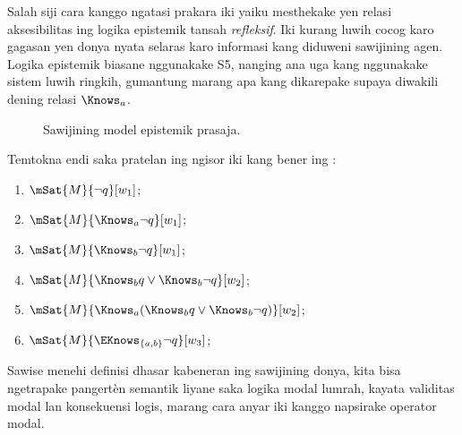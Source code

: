 \documentclass[../../../include/open-logic-section]{subfiles}
\begin{document}
Salah siji cara kanggo ngatasi prakara iki yaiku mesthekake yen
relasi aksesibilitas ing logika epistemik tansah \emph{refleksif}.
Iki kurang luwih cocog karo gagasan yen donya nyata selaras karo
informasi kang diduweni sawijining agen. Logika epistemik biasane
nggunakake S5, nanging ana uga kang nggunakake sistem luwih ringkih,
gumantung marang apa kang dikarepake supaya diwakili dening relasi
$\Knows_a$.

\begin{figure}
  \begin{center}
  \end{center}
  \caption{Sawijining model epistemik prasaja.}
\end{figure}

\begin{prob}
  Temtokna endi saka pratelan ing ngisor iki kang bener ing
  :
  \begin{enumerate}
    \item $\mSat{M}{\lnot q}[w_1]$;
    \item $\mSat{M}{\Knows_a \lnot q}[w_1]$;
    \item $\mSat{M}{\Knows_b \lnot q}[w_1]$;
    \item $\mSat{M}{\Knows_b q \lor \Knows_b \lnot q}[w_2]$;
    \item $\mSat{M}{\Knows_a( \Knows_b q \lor \Knows_b \lnot q)}[w_2]$;
    \item $\mSat{M}{\EKnows_{\{a,b\}} \lnot q}[w_3]$;
    \end{enumerate}
\end{prob}

Sawise menehi definisi dhasar kabeneran ing sawijining donya, kita
bisa ngetrapake pangertèn semantik liyane saka logika modal lumrah,
kayata validitas modal lan konsekuensi logis, marang cara anyar iki
kanggo napsirake operator modal.
\end{document}
